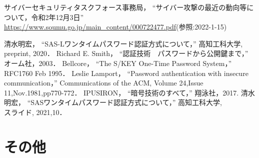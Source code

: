 \documentclass{thesis}
\begin{document}
\begin{thebibliography}{99}
%
サイバーセキュリティタスクフォース事務局，
``サイバー攻撃の最近の動向等について，令和2年12月3日''\\
\url{https://www.soumu.go.jp/main_content/000722477.pdf}(参照:2022-1-15)

%
%
清水明宏，
``SAS-Lワンタイムパスワード認証方式について，''
高知工科大学,\\
 preprint, 2020．
Richard E. Smith，
``認証技術　パスワードから公開鍵まで，''
オーム社，2003．
Bellcore，
``The S/KEY One-Time Password System，''
RFC1760 Feb 1995．
Leslie Lamport，
``Password authentication with insecure communication，''
Communications of the ACM, Volume 24,Issue 11,Nov.1981,pp770-772．
IPUSIRON，
``暗号技術のすべて，''
翔泳社，2017.
%
清水明宏，
``SASワンタイムパスワード認証方式について，''
高知工科大学,\\
 スライド, 2021,10．
%
\end{thebibliography}

\appendix

\chapter{その他}
\end{document}
